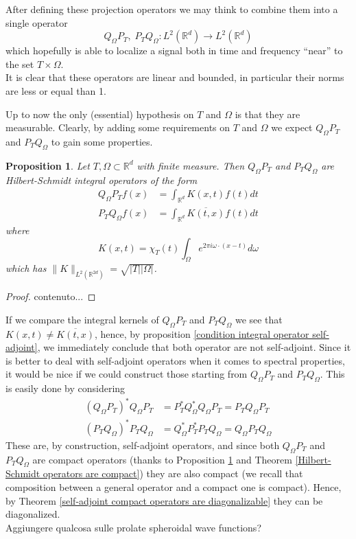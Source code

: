 \documentclass[corpo=11pt, stile=classica, tipotesi=custom,
greek, evenboxes, english]{toptesi}
\numberwithin{equation}{chapter}
\newtheorem{prop}[teo]{Proposition}
\theoremstyle{remark}
\newcommand{\R}{\mathbb{R}} %
\begin{document}
After defining these projection operators we may think to combine them into a single operator
\begin{equation*}\label{composition of projections}
	Q_{\Omega} P_T, \; P_T Q_{\Omega} : L^2(\R^d) \rightarrow L^2(\R^d)
\end{equation*}
which hopefully is able to localize a signal both in time and frequency ``near'' to the set $T \times \Omega$.\\
It is clear that these operators are linear and bounded, in particular their norms are less or equal than 1.

Up to now the only (essential) hypothesis on $T$ and $\Omega$ is that they are measurable. Clearly, by adding some requirements on $T$ and $\Omega$ we expect $Q_{\Omega} P_T$ and $P_T Q_{\Omega}$ to gain some properties.
\begin{prop}\label{projection operators are Hilbert-Schmidt}
	Let $T,\Omega \subset \R^d$ with finite measure. Then $Q_{\Omega} P_T$ and $P_T Q_{\Omega}$ are Hilbert-Schmidt integral operators of the form
	\begin{align}
		Q_{\Omega} P_T f(x) &= \int_{\R^d} K(x,t) f(t) dt \\
		P_T Q_{\Omega} f(x) &= \int_{\R^d} \overline{K(t,x)}f(t)dt
	\end{align}
	where
	\begin{equation}\label{integral kernel projection operators}
		K(x,t) = \chi_T(t) \int_{\Omega} e^{2 \pi i \omega \cdot (x-t)}d\omega
	\end{equation}
	which has $\| K \|_{L^2(\R^{2d})} = \sqrt{|T||\Omega|}$.
\end{prop}
\begin{proof}
	contenuto...
\end{proof}
If we compare the integral kernels of $Q_{\Omega} P_T$ and $P_T Q_{\Omega}$ we see that $K(x,t) \neq \overline{K(t,x)}$, hence, by proposition \ref{condition integral operator self-adjoint}, we immediately conclude that both operator are not self-adjoint. {\color{red} Since it is better to deal with self-adjoint operators when it comes to spectral properties, it would be nice if we could construct those starting from $Q_{\Omega} P_T$ and $P_T Q_{\Omega}$.} This is easily done by considering
\begin{align}
	(Q_{\Omega} P_T)^* Q_{\Omega} P_T &= P_T^* Q_{\Omega}^* Q_{\Omega} P_T= P_T Q_{\Omega} P_T\\
	(P_T Q_{\Omega})^* P_T Q_{\Omega} &= Q_{\Omega}^* P_T^* P_T Q_{\Omega} = Q_{\Omega} P_T Q_{\Omega}
\end{align} 
These are, by construction, self-adjoint operators, and since both $Q_{\Omega} P_T$ and $P_T Q_{\Omega}$ are compact operators (thanks to Proposition \ref{projection operators are Hilbert-Schmidt} and Theorem \ref{Hilbert-Schmidt operators are compact}) they are also compact (we recall that composition between a general operator and a compact one is compact). Hence, by Theorem \ref{self-adjoint compact operators are diagonalizable} they can be diagonalized.\\
{\color{red} Aggiungere qualcosa sulle prolate spheroidal wave functions?}
\end{document}
